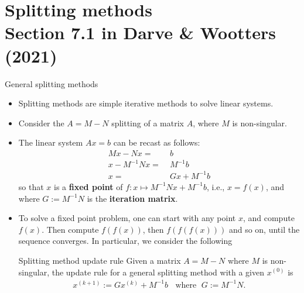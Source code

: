 \documentclass[t,usepdftitle=false]{beamer}
\begin{document}
\section{Splitting methods\\{\small Section 7.1 in Darve \& Wootters (2021)}}

\begin{frame}{General splitting methods}
\begin{itemize}
\item Splitting methods are simple iterative methods to solve linear systems.
\item Consider the $A=M-N$ splitting of a matrix $A$, where $M$ is non-singular.
\item The linear system $Ax=b$ can be recast as follows:
\begin{align*}
Mx-Nx=&\;b\\
x-M^{-1}Nx=&\;M^{-1}b\\
x=&\;Gx+M^{-1}b
\end{align*}
so that $x$ is a \textbf{fixed point} of $f:x\mapsto M^{-1}Nx+M^{-1}b$, i.e., $x=f(x)$, and where $G:=M^{-1}N$ is the \textbf{iteration matrix}.
\item To solve a fixed point problem, one can start with any point $x$, and compute $f(x)$.
Then compute $f(f(x))$, then $f(f(f(x)))$ and so on, until the sequence converges.
In particular, we consider the following\vspace{-.05cm}
\begin{block}{Splitting method update rule}
Given a matrix $A=M-N$ where $M$ is non-singular, the update rule for a general splitting method with a given $x^{(0)}$ is\vspace{-.3cm}
\begin{align*}
x^{(k+1)}:=Gx^{(k)}+M^{-1}b
\;\;\text{ where }\;G:=M^{-1}N.
\end{align*}
\vspace{-.85cm}\\
\end{block}
\end{itemize}
\end{frame}
\end{document}
